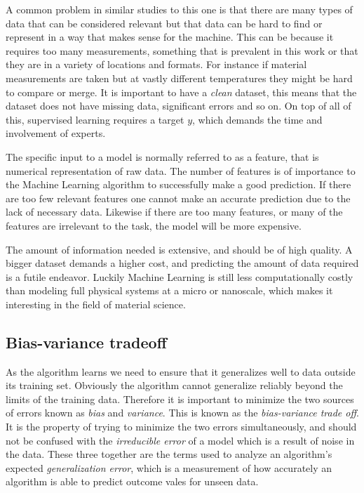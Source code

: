 	A common problem in similar studies to this one is that there are many types of data that can be considered relevant but that data can be hard to find or represent in a way that makes sense for the machine. This can be because it requires too many measurements, something that is prevalent in this work or that they are in a variety of locations and formats. For instance if material measurements are taken but at vastly different temperatures they might be hard to compare or merge. It is important to have a \textit{clean} dataset, this means that the dataset does not have missing data, significant errors and so on. On top of all of this, supervised learning requires a target $y$, which demands the time and involvement of experts.
	
	The specific input to a model is normally referred to as a feature, that is numerical representation of raw data. The number of features is of importance to the Machine Learning algorithm to successfully make a good prediction. If there are too few relevant features one cannot make an accurate prediction due to the lack of necessary data. Likewise if there are too many features, or many of the features are irrelevant to the task, the model will be more expensive.
	
	The amount of information needed is extensive, and should be of high quality. A bigger dataset demands a higher cost, and predicting the amount of data required is a futile endeavor. Luckily Machine Learning is still less computationally costly than modeling full physical systems at a micro or nanoscale, which makes it interesting in the field of material science.
	
	
\subsection{Bias-variance tradeoff}\label{sec:Bias-variance tradeoff}

As the algorithm learns we need to ensure that it generalizes well to data outside its training set. Obviously the algorithm cannot generalize reliably beyond the limits of the training data. Therefore it is important to minimize the two sources of errors known as \textit{bias} and \textit{variance}. This is known as the \textit{bias-variance trade off}. It is the property of trying to minimize the two errors simultaneously, and should not be confused with the \textit{irreducible error} of a model which is a result of noise in the data. These three together are the terms used to analyze an algorithm's expected \textit{generalization error}, which is a measurement of how accurately an algorithm is able to predict outcome vales for unseen data.



